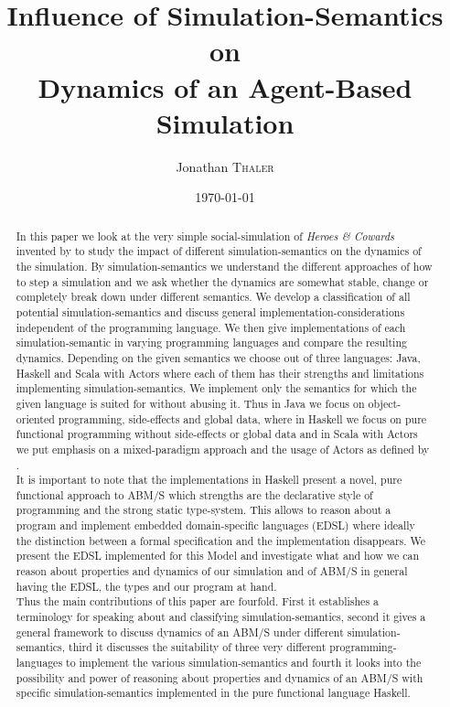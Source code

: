 \documentclass{article}
\title{Influence of Simulation-Semantics on \\ Dynamics of an Agent-Based Simulation} %
\author{Jonathan \textsc{Thaler}} %
\date{\today} %
\begin{document}
\maketitle %

\begin{abstract}
In this paper we look at the very simple social-simulation of \textit{Heroes \& Cowards} invented by \cite{wilensky_introduction_2015} to study the impact of different simulation-semantics on the dynamics of the simulation. By simulation-semantics we understand the different approaches of how to step a simulation and we ask whether the dynamics are somewhat stable, change or completely break down under different semantics. We develop a classification of all potential simulation-semantics and discuss general implementation-considerations independent of the programming language. We then give implementations of each simulation-semantic in varying programming languages and compare the resulting dynamics. Depending on the given semantics we choose out of three languages: Java, Haskell and Scala with Actors where each of them has their strengths and limitations implementing simulation-semantics. We implement only the semantics for which the given language is suited for without abusing it. Thus in Java we focus on object-oriented programming, side-effects and global data, where in Haskell we focus on pure functional programming without side-effects or global data and in Scala with Actors we put emphasis on a mixed-paradigm approach and the usage of Actors as defined by \cite{agha_actors:_1986}. \\
It is important to note that the implementations in Haskell present a novel, pure functional approach to ABM/S which strengths are the declarative style of programming and the strong static type-system. This allows to reason about a program and implement embedded domain-specific languages (EDSL) where ideally the distinction between a formal specification and the implementation disappears. We present the EDSL implemented for this Model and investigate what and how we can reason about properties and dynamics of our simulation and of ABM/S in general having the EDSL, the types and our program at hand. \\
Thus the main contributions of this paper are fourfold. First it establishes a terminology for speaking about and classifying simulation-semantics, second it gives a general framework to discuss dynamics of an ABM/S under different simulation-semantics, third it discusses the suitability of three very different programming-languages to implement the various simulation-semantics and fourth it looks into the possibility and power of reasoning about properties and dynamics of an ABM/S with specific simulation-semantics implemented in the pure functional language Haskell.
\end{abstract}
\end{document}
